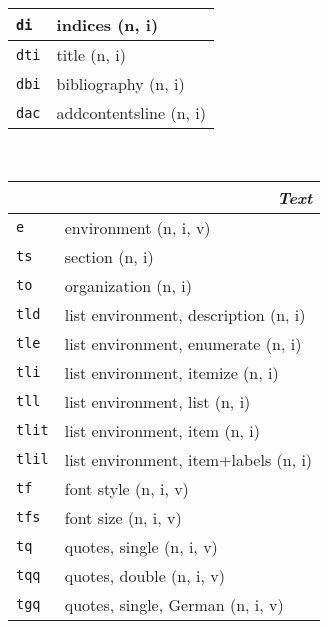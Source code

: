 \documentclass[oneside,10pt,landscape,DIV17]{scrartcl}
\newcommand{\Map}[1] {\textbf{\textasciiacute}\texttt{#1}}
\begin{document}
\begin{multicols}{3}
\begin{center}
\begin{tabular}[]{|p{11mm}|p{60mm}|}
\hline     \Map{di}  &  indices                     \hfill (n, i)\\
\hline     \Map{dti} &  title                       \hfill (n, i)\\
\hline     \Map{dbi} &  bibliography                \hfill (n, i)\\
\hline     \Map{dac} &  addcontentsline             \hfill (n, i)\\
\hline
%
\end{tabular}\\
%
\begin{tabular}[]{|p{11mm}|p{60mm}|}
\hline
\multicolumn{2}{|r|}{\textsl{\textbf{T}ext}}                 \\[1.0ex]
\hline \Map{e}    & environment                    \hfill (n, i, v)\\
\hline \Map{ts}   & section                        \hfill (n, i)\\
\hline \Map{to}   & organization                   \hfill (n, i)\\
\hline \Map{tld}  & list environment, description  \hfill (n, i)\\
\hline \Map{tle}  & list environment, enumerate    \hfill (n, i)\\
\hline \Map{tli}  & list environment, itemize      \hfill (n, i)\\
\hline \Map{tll}  & list environment, list         \hfill (n, i)\\
\hline \Map{tlit} & list environment, item         \hfill (n, i)\\
\hline \Map{tlil} & list environment, item+labels  \hfill (n, i)\\
\hline \Map{tf}   & font style                     \hfill (n, i, v)\\
\hline \Map{tfs}  & font size                      \hfill (n, i, v)\\
\hline \Map{tq}   & quotes, single                 \hfill (n, i, v)\\
\hline \Map{tqq}  & quotes, double                 \hfill (n, i, v)\\
\hline \Map{tgq}  & quotes, single, German         \hfill (n, i, v)\\

\end{tabular}
\end{center}
\end{multicols}
\end{document}
